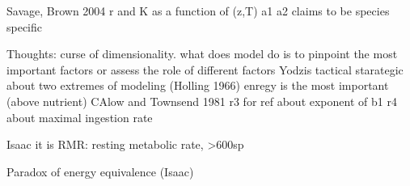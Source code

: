  Savage, Brown 2004 r and K as a function of (z,T)
 a1 a2 claims to be species specific
 
 
 
 Thoughts: curse of dimensionality. what does model do is to pinpoint the most important factors or assess the role of different factors
 Yodzis
 tactical starategic about two extremes of modeling (Holling 1966)
enregy is the most important (above nutrient) CAlow and Townsend 1981
r3 for ref about exponent of b1
r4 about maximal ingestion rate

Isaac it is RMR: resting metabolic rate, >600sp

Paradox of energy equivalence  (Isaac)
